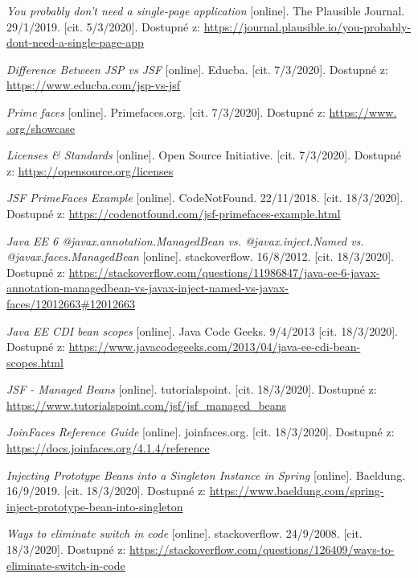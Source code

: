 \documentclass[thesis=M,czech]{FITthesis}[2019/12/23]
\begin{document}
\begin{thebibliography}{9}
	\textit{You probably don't need a single-page application} [online]. The Plausible Journal. 29/1/2019. [cit. 5/3/2020]. Dostupné z: \url{https://journal.plausible.io/you-probably-dont-need-a-single-page-app}

	\textit{Difference Between JSP vs JSF} [online]. Educba. [cit. 7/3/2020]. Dostupné z: \url{https://www.educba.com/jsp-vs-jsf}
	
	\textit{Prime faces} [online]. Primefaces.org. [cit. 7/3/2020]. Dostupné z: \url{https://www.
	.org/showcase}
	
	\textit{Licenses \& Standards} [online]. Open Source Initiative. [cit. 7/3/2020]. Dostupné z: \url{https://opensource.org/licenses}
	
	\textit{JSF PrimeFaces Example} [online]. CodeNotFound. 22/11/2018. [cit. 18/3/2020]. Dostupné z: \url{https://codenotfound.com/jsf-primefaces-example.html}
	
	\textit{Java EE 6 @javax.annotation.ManagedBean vs. @javax.inject.Named vs. @javax.faces.ManagedBean} [online]. stackoverflow. 16/8/2012. [cit. 18/3/2020]. Dostupné z: \url{https://stackoverflow.com/questions/11986847/java-ee-6-javax-annotation-managedbean-vs-javax-inject-named-vs-javax-faces/12012663#12012663}
	
	\textit{Java EE CDI bean scopes} [online]. Java Code Geeks. 9/4/2013 [cit. 18/3/2020]. Dostupné z: \url{https://www.javacodegeeks.com/2013/04/java-ee-cdi-bean-scopes.html}
	
	\textit{JSF - Managed Beans} [online]. tutorialspoint. [cit. 18/3/2020]. Dostupné z: \url{https://www.tutorialspoint.com/jsf/jsf_managed_beans}
	
	\textit{JoinFaces Reference Guide} [online]. joinfaces.org. [cit. 18/3/2020]. Dostupné z: \url{https://docs.joinfaces.org/4.1.4/reference}
	
	\textit{Injecting Prototype Beans into a Singleton Instance in Spring} [online]. Baeldung. 16/9/2019. [cit. 18/3/2020]. Dostupné z: \url{https://www.baeldung.com/spring-inject-prototype-bean-into-singleton}
	
	\textit{Ways to eliminate switch in code} [online]. stackoverflow. 24/9/2008. [cit. 18/3/2020]. Dostupné z: \url{https://stackoverflow.com/questions/126409/ways-to-eliminate-switch-in-code}
	

\end{thebibliography}
\end{document}
